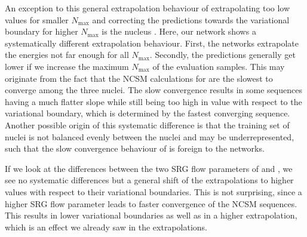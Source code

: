 An exception to this general extrapolation behaviour of extrapolating too low values for smaller $N_\mathrm{max}$ and correcting the predictions towards the variational boundary for higher $N_\mathrm{max}$ is the nucleus . Here, our network shows a systematically different extrapolation behaviour. First, the networks extrapolate the energies not far enough for all $N_\mathrm{max}$. Secondly, the predictions generally get lower if we increase the maximum $N_\mathrm{max}$ of the evaluation samples. This may originate from the fact that the NCSM calculations for  are the slowest to converge among the three nuclei. The slow convergence results in some sequences having a much flatter slope while still being too high in value with respect to the variational boundary, which is determined by the fastest converging sequence. Another possible origin of this systematic difference is that the training set of nuclei is not balanced evenly between the nuclei and  may be underrepresented, such that the slow convergence behaviour of  is foreign to the networks.

If we look at the differences between the two SRG flow parameters of  and , we see no systematic differences but a general shift of the extrapolations to higher values with respect to their variational boundaries. This is not surprising, since a higher SRG flow parameter leads to faster convergence of the NCSM sequences. This results in lower variational boundaries as well as in a higher extrapolation, which is an effect we already saw in the  extrapolations.
